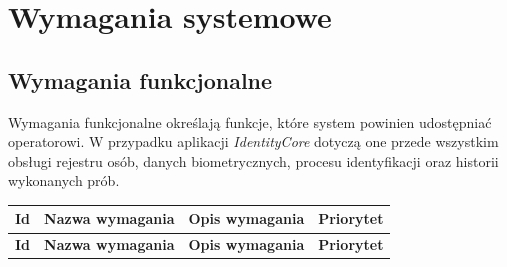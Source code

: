 \chapter{Wymagania systemowe}
\label{chap:wymagania-systemowe}

\section{Wymagania funkcjonalne}

Wymagania funkcjonalne określają funkcje, które system powinien udostępniać operatorowi. W przypadku aplikacji \textit{IdentityCore} dotyczą one przede wszystkim obsługi rejestru osób, danych biometrycznych, procesu identyfikacji oraz historii wykonanych prób.

\renewcommand{\arraystretch}{1.15}
\begin{xltabular}{\textwidth}{|
    >{\RaggedRight\arraybackslash}p{1.5cm}|
    >{\RaggedRight\arraybackslash}p{3.2cm}|
    >{\RaggedRight\arraybackslash}X|
    >{\RaggedRight\arraybackslash}p{1.8cm}|}
    
    \hline
    \textbf{Id} & \textbf{Nazwa wymagania} & \textbf{Opis wymagania} & \textbf{Priorytet} \\
    \hline
    \endfirsthead

    \hline
    \textbf{Id} & \textbf{Nazwa wymagania} & \textbf{Opis wymagania} & \textbf{Priorytet} \\
    \hline
    \endhead


\end{xltabular}
